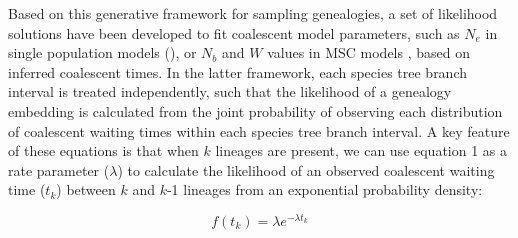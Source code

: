 \documentclass[11pt]{article}
\begin{document}
Based on this generative framework for sampling genealogies, a set of likelihood
solutions have been developed to fit coalescent model parameters, such as 
$N_e$ in single population models (\citep{kingman1982coalescent}), 
or $N_b$ and $W$ values in MSC 
models \citep{rannala2003bayes}, based on inferred coalescent times. 
In the latter framework, each species tree branch interval is treated independently, 
such that the likelihood of a genealogy embedding is calculated from the joint
probability of observing each distribution of coalescent waiting times within
each species tree branch interval. A key feature of these equations is that 
when $k$ lineages are present, we can use equation 1 as a rate parameter ($\lambda$)
to calculate the likelihood of an observed coalescent waiting time ($t_k$) between
$k$ and $k$-1 lineages from an exponential probability density:
	
\begin{equation}
	f(t_k) = \lambda e^{-\lambda t_k} 	
\end{equation}





\end{document}
